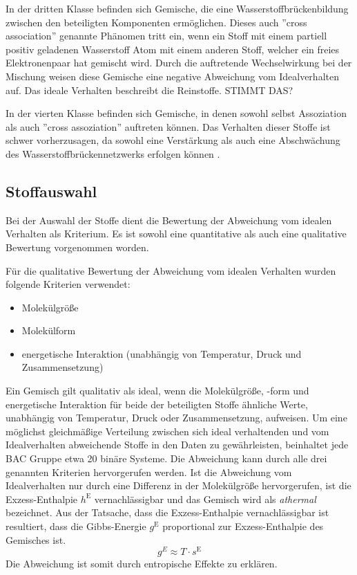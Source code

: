 \documentclass[../thesis.tex]{subfiles}
\begin{document}
In der dritten Klasse befinden sich Gemische, die eine Wasserstoffbrückenbildung zwischen den beteiligten Komponenten ermöglichen. Dieses auch ''cross association'' genannte Phänomen tritt ein, wenn ein Stoff mit einem partiell positiv geladenen Wasserstoff Atom mit einem anderen Stoff, welcher ein freies Elektronenpaar hat gemischt wird. Durch die auftretende Wechselwirkung bei der Mischung weisen diese Gemische eine negative Abweichung vom Idealverhalten auf. Das ideale Verhalten beschreibt die Reinstoffe. STIMMT DAS?

In der vierten Klasse befinden sich Gemische, in denen sowohl selbst Assoziation als auch ''cross assoziation'' auftreten können. Das Verhalten dieser Stoffe ist schwer vorherzusagen, da sowohl eine Verstärkung als auch eine Abschwächung des Wasserstoffbrückennetzwerks erfolgen können \cite{jaubert2020benchmark}.

\subsection{Stoffauswahl}

Bei der Auswahl der Stoffe dient die Bewertung der Abweichung vom idealen Verhalten als Kriterium. Es ist sowohl eine quantitative als auch eine qualitative Bewertung vorgenommen worden.

Für die qualitative Bewertung der Abweichung vom idealen Verhalten wurden folgende Kriterien verwendet:
\begin{itemize}
	\item Molekülgröße
	\item Molekülform
	\item energetische Interaktion (unabhängig von Temperatur, Druck und Zusammensetzung)
\end{itemize}
Ein Gemisch gilt qualitativ als ideal, wenn die Molekülgröße, -form und energetische Interaktion für beide der beteiligten Stoffe ähnliche Werte, unabhängig von Temperatur, Druck oder Zusammensetzung, aufweisen.
Um eine möglichst gleichmäßige Verteilung zwischen sich ideal verhaltenden und vom Idealverhalten abweichende Stoffe in den Daten zu gewährleisten, beinhaltet jede BAC Gruppe etwa 20 binäre Systeme.
Die Abweichung kann durch alle drei genannten Kriterien hervorgerufen werden. Ist die Abweichung vom Idealverhalten nur durch eine Differenz in der Molekülgröße hervorgerufen, ist die Exzess-Enthalpie $h^{\mathrm{E}}$ vernachlässigbar und das Gemisch wird als \textit{athermal} bezeichnet. Aus der Tatsache, dass die Exzess-Enthalpie vernachlässigbar ist resultiert, dass die Gibbs-Energie $g^{\mathrm{E}}$ proportional zur Exzess-Enthalpie des Gemisches ist.
\begin{equation}
	g^E \approx T \cdot s^{\mathrm{E}}
\end{equation}   
Die Abweichung ist somit durch entropische Effekte zu erklären.
\end{document}
